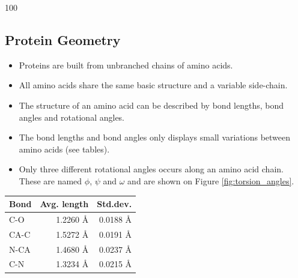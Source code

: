 \documentclass[a0,portrait]{a0poster}
\begin{document}
\begin{GridBlockFill}{0}{44}{100}

  \begin{multicols}{2}
\begin{minipage}{\linewidth} 
    \begin{multicols}{2}
    \section{Protein Geometry}

    \begin{itemize}
    \item Proteins are built from unbranched chains of amino acids.
    \item All amino acids share
      the same basic structure and a variable side-chain.
    \item The structure of an amino acid can be described by bond lengths,
      bond angles and rotational angles.
    \item The bond lengths and bond angles only displays small variations
      between amino acids (see tables).
    \item Only three different rotational angles occurs along an amino
      acid chain. These are named $\phi$, $\psi$ and $\omega$ and are
      shown on Figure \ref{fig:torsion_angles}.
    \end{itemize} 
   \end{multicols}

\begin{multicols}{2}


\begin{minipage}{\linewidth} 
\centering

  \vspace{7mm}
  \begin{tabular}{lrr}
    \multicolumn{1}{c}{Bond} & \multicolumn{1}{c}{Avg. length} & \multicolumn{1}{c}{Std.dev.} \\ \midrule
    C-O   & 1.2260 Å & 0.0188 Å\\
    CA-C  & 1.5272 Å & 0.0191 Å\\
    N-CA  & 1.4680 Å & 0.0237 Å\\
    C-N   & 1.3234 Å & 0.0215 Å\\
  \end{tabular}
  \vspace{4mm}
  \label{tab:average_bond_lengths}
\end{minipage}



\end{multicols}
\end{minipage}
\end{multicols}
\end{GridBlockFill}
\end{document}
